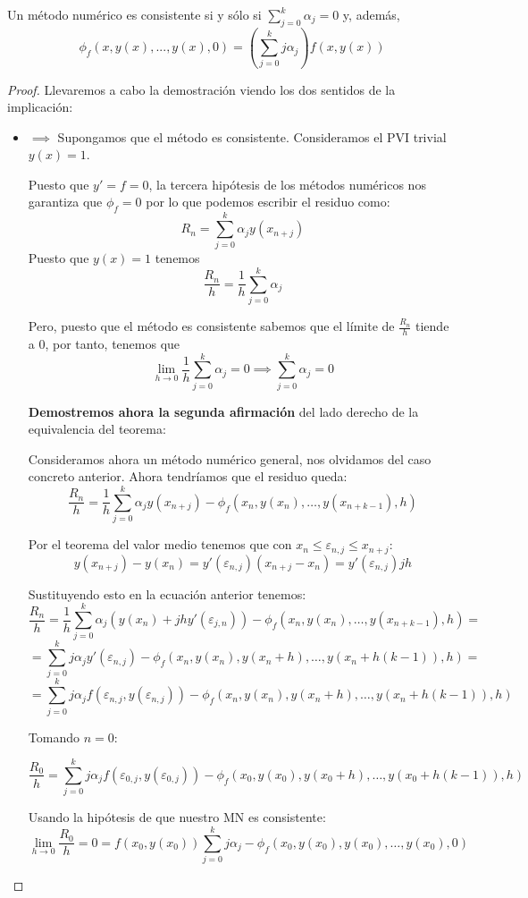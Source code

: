 \begin{theorem}\label{theorem:consist_iif_relaciones}
Un método numérico es consistente si y sólo si $\sum_{j=0}^kα_j=0$ y, además,
\[\phi_f(x,y(x),...,y(x),0)=\left( \sum_{j=0}^kjα_j\right)f(x,y(x))\]
\end{theorem}
\begin{proof}
Llevaremos a cabo la demostración viendo los dos sentidos de la implicación:
\begin{itemize}
\item $\implies$
Supongamos que el método es consistente. Consideramos el PVI trivial $y(x)=1$.

Puesto que $y'=f=0$, la tercera hipótesis de los métodos numéricos nos garantiza que $\phi_f=0$ por lo que podemos escribir el residuo como:
\[R_n = \sum_{j=0}^kα_jy(x_{n+j})\]
Puesto que $y(x)=1$ tenemos
\[ \frac{R_n}{h}=\frac{1}{h}\sum_{j=0}^kα_j\]

Pero, puesto que el método es consistente sabemos que el límite de $\frac{R_n}{h}$ tiende a 0, por tanto, tenemos que 
\[\lim_{h\to 0} \frac{1}{h}\sum_{j=0}^kα_j=0 \implies \sum_{j=0}^kα_j=0\]

\textbf{Demostremos ahora la segunda afirmación} del lado derecho de la equivalencia del teorema:

Consideramos ahora un método numérico general, nos olvidamos del caso concreto anterior. Ahora tendríamos que el residuo queda:
\[\frac{R_n}{h}=\frac{1}{h}\sum_{j=0}^kα_jy(x_{n+j})-\phi_f(x_n,y(x_n),…,y(x_{n+k-1}),h)\]

Por el teorema del valor medio tenemos que con $x_n ≤ ε_{n,j} ≤ x_{n+j}$:
\[y(x_{n+j})-y(x_n)=y'(ε_{n,j})(x_{n+j}-x_n) = y'(ε_{n,j})jh\]

Sustituyendo esto en la ecuación anterior tenemos:
\[\frac{R_n}{h}=\frac{1}{h}\sum_{j=0}^kα_j(y(x_n)+jhy'(ε_{j,n}))-\phi_f(x_n,y(x_n),…,y(x_{n+k-1}),h) = \]
\[ = \sum_{j=0}^k jα_jy'(ε_{n,j}) - \phi_f\left(x_n,y(x_n), y(x_n+h) , …, y(x_n + h(k-1)), h\right) = \]
\[ = \sum_{j=0}^k jα_jf(ε_{n,j}, y(ε_{n,j})) - \phi_f\left(x_n,y(x_n), y(x_n+h) , …, y(x_n + h(k-1)), h\right)\]

Tomando \underline{$n=0$}:

\[\frac{R_0}{h} = \sum_{j=0}^k jα_jf(ε_{0,j}, y(ε_{0,j})) - \phi_f\left(x_0,y(x_0), y(x_0+h) , …, y(x_0 + h(k-1)), h\right)\]

Usando la hipótesis de que nuestro MN es consistente:
\[\lim_{h\to0} \frac{R_0}{h} = 0 = f(x_0, y(x_0)) \sum_{j=0}^k jα_j - \phi_f\left(x_0,y(x_0), y(x_0) , …, y(x_0), 0\right) \]


\end{itemize}
\end{proof}
